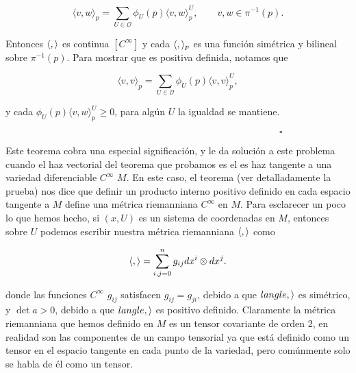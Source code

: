 \documentclass[a4paper,10pt]{article}
\numberwithin{equation}{section}
\begin{document}
\begin{equation}
 \langle v, w \rangle_p = \sum_{U \in \mathcal{O}} \phi_U(p)\langle v, w \rangle_p^U, 
 \qquad v,w \in \pi^{-1}(p).
\end{equation}

Entonces $\langle \space, \space \rangle$ es continua $[C^\infty]$ y 
cada $\langle \space, \space \rangle_p$ es una función simétrica y 
bilineal sobre $\pi^{-1}(p)$. Para mostrar que es positiva definida, 
notamos que 

\begin{equation}
 \langle v, v \rangle_p =  \sum_{U \in \mathcal{O}} \phi_U(p)\langle v, v \rangle_p^U,
\end{equation}

y cada $\phi_U(p)\langle v, w \rangle_p^U \geq 0$, para algún $U$ la igualdad 
se mantiene.

$\hspace{12cm} \square$

Este teorema cobra una especial significación, y le da solución a este
problema cuando el haz vectorial del teorema que probamos es el es haz 
tangente a una variedad diferenciable $C^\infty$ $M$. En este caso, 
el teorema (ver detalladamente la prueba) nos dice que definir un producto 
interno positivo definido en cada espacio tangente a $M$ define una 
métrica riemanniana $C^\infty$ en $M$. Para esclarecer un poco lo que hemos hecho,
si $(x,U)$ es un sistema de coordenadas en $M$, entonces sobre $U$ podemos 
escribir nuestra métrica riemanniana $\langle \space, \space \rangle$ como 

\begin{equation}
 \langle \space , \space \rangle = \sum_{i,j = 0}^n g_{ij}dx^i \otimes dx^j.
\end{equation}

donde las funciones $C^\infty$ $g_{ij}$ satisfacen $g_{ij} = g_{ji}$, debido 
a que $langle \space , \space \rangle$ es simétrico, y $\det{a} > 0$, debido a
que $langle \space , \space \rangle$ es positivo definido. Claramente la métrica 
riemanniana que hemos definido en $M$ es un tensor covariante de orden 2, en realidad 
son las componentes de un campo tensorial ya que está definido como un tensor 
en el espacio tangente en cada punto de la variedad, pero comúnmente 
solo se habla de él como un tensor.
\end{document}
